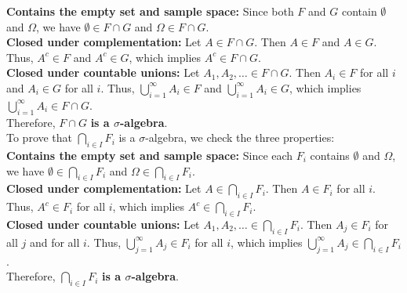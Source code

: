 \begin{example}
\textbf{Contains the empty set and sample space:} Since both \( F \) and \( G \) contain \( \emptyset \) and \( \Omega \), we have \( \emptyset \in F \cap G \) and \( \Omega \in F \cap G \).\\
    
\textbf{Closed under complementation:} Let \( A \in F \cap G \). Then \( A \in F \) and \( A \in G \). Thus, \( A^c \in F \) and \( A^c \in G \), which implies \( A^c \in F \cap G \).\\
    
\textbf{Closed under countable unions:} Let \( A_1, A_2, \ldots \in F \cap G \). Then \( A_i \in F \) for all \( i \) and \( A_i \in G \) for all \( i \). Thus, \( \bigcup_{i=1}^\infty A_i \in F \) and \( \bigcup_{i=1}^\infty A_i \in G \), which implies \( \bigcup_{i=1}^\infty A_i \in F \cap G \).\\

Therefore, \( F \cap G \) \textbf{is a \(\sigma\)-algebra}.\\

To prove that \( \bigcap_{i \in I} F_i \) is a \(\sigma\)-algebra, we check the three properties:\\

\textbf{Contains the empty set and sample space:} Since each \( F_i \) contains \( \emptyset \) and \( \Omega \), we have \( \emptyset \in \bigcap_{i \in I} F_i \) and \( \Omega \in \bigcap_{i \in I} F_i \).\\
    
\textbf{Closed under complementation:} Let \( A \in \bigcap_{i \in I} F_i \). Then \( A \in F_i \) for all \( i \). Thus, \( A^c \in F_i \) for all \( i \), which implies \( A^c \in \bigcap_{i \in I} F_i \).\\

\textbf{Closed under countable unions:} Let \( A_1, A_2, \ldots \in \bigcap_{i \in I} F_i \). Then \( A_j \in F_i \) for all \( j \) and for all \( i \). Thus, \( \bigcup_{j=1}^\infty A_j \in F_i \) for all \( i \), which implies \( \bigcup_{j=1}^\infty A_j \in \bigcap_{i \in I} F_i \).\\

Therefore, \( \bigcap_{i \in I} F_i \) \textbf{is a \(\sigma\)-algebra}.\\

\end{example}

